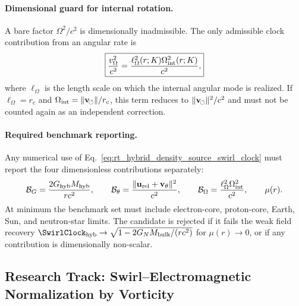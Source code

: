 \paragraph{Dimensional guard for internal rotation.}
A bare factor $\Omega^2/c^2$ is dimensionally inadmissible.  The only admissible
clock contribution from an angular rate is
\begin{equation}
\boxed{
\frac{v_{\Omega}^{2}}{c^2}
=
\frac{\ell_{\Omega}^{2}(r;K)\Omega_{\rm int}^{2}(r;K)}{c^2},
}
\label{eq:rt_omega_dimensional_guard}
\end{equation}
where $\ell_{\Omega}$ is the length scale on which the internal angular mode is
realized.  If $\ell_{\Omega}=r_c$ and $\Omega_{\rm int}=\|\vswirl\|/r_c$, this term
reduces to $\|\vswirl\|^2/c^2$ and must not be counted again as an independent
correction.

\paragraph{Required benchmark reporting.}
Any numerical use of Eq.~\eqref{eq:rt_hybrid_density_source_swirl_clock} must
report the four dimensionless contributions separately:
\begin{equation}
\mathcal{B}_{G}
=\frac{2G_{\rm hyb}M_{\rm hyb}}{r c^2},
\qquad
\mathcal{B}_{\theta}
=\frac{\|\mathbf{u}_{\rm rel}+\mathbf{v}_{\theta}\|^2}{c^2},
\qquad
\mathcal{B}_{\Omega}
=\frac{\ell_{\Omega}^{2}\Omega_{\rm int}^{2}}{c^2},
\qquad
\mu(r).
\end{equation}
At minimum the benchmark set must include electron-core, proton-core, Earth,
Sun, and neutron-star limits.  The candidate is rejected if it fails the weak
field recovery $\SwirlClock_{\rm hyb}\to\sqrt{1-2G_NM_{\rm bulk}/(r c^2)}$ for
$\mu(r)\to0$, or if any contribution is dimensionally non-scalar.

\subsection{Research Track: Swirl--Electromagnetic Normalization by Vorticity}
\label{app:research_swirl_em_vorticity}

\providecommand{\swirlarrow}{\boldsymbol{\circlearrowleft}}
\providecommand{\vswirl}{\mathbf{v}_{\!\boldsymbol{\circlearrowleft}}}
\providecommand{\vnorm}{\lVert\mathbf{v}_{\!\boldsymbol{\circlearrowleft}}\rVert}
\providecommand{\vchar}{v_{\!\boldsymbol{\circlearrowleft}}^{\ast}}
\providecommand{\uswirl}{\mathbf{u}_{\!\boldsymbol{\circlearrowleft}}}
\providecommand{\omegaswirl}{\boldsymbol{\omega}_{\!\boldsymbol{\circlearrowleft}}}
\providecommand{\rhoF}{\rho_{\!f}}
\providecommand{\rhoE}{\rho_{\!E}}
\providecommand{\rhoM}{\rho_{\!m}}
\providecommand{\rc}{r_c}
\providecommand{\Fmax}{F_{\max}^{\rm swirl}}

